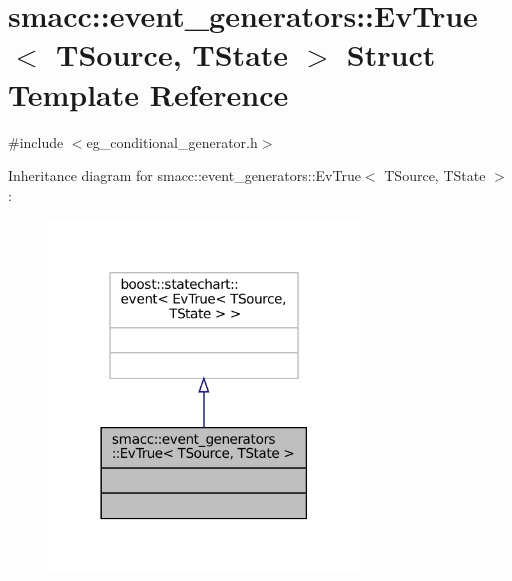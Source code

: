 \hypertarget{structsmacc_1_1event__generators_1_1EvTrue}{}\section{smacc\+:\+:event\+\_\+generators\+:\+:Ev\+True$<$ T\+Source, T\+State $>$ Struct Template Reference}
\label{structsmacc_1_1event__generators_1_1EvTrue}


{\ttfamily \#include $<$eg\+\_\+conditional\+\_\+generator.\+h$>$}



Inheritance diagram for smacc\+:\+:event\+\_\+generators\+:\+:Ev\+True$<$ T\+Source, T\+State $>$\+:
\nopagebreak
\begin{figure}[H]
\begin{center}
\leavevmode
\includegraphics[width=234pt]{structsmacc_1_1event__generators_1_1EvTrue__inherit__graph}
\end{center}
\end{figure}


